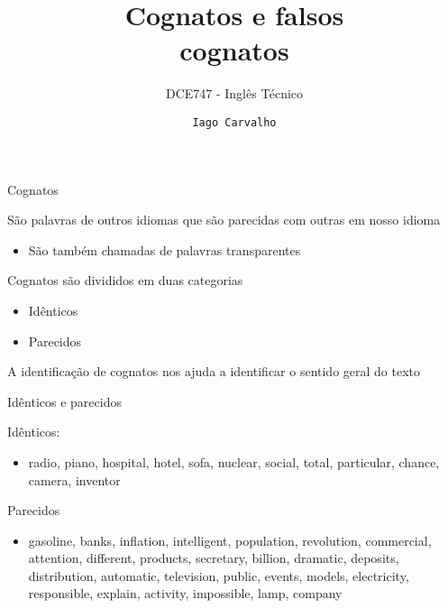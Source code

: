 \documentclass[compress,mathserif]{beamer}
\title{Cognatos e falsos\\ cognatos}
\subtitle{DCE747 - Inglês Técnico}
\author{\texttt{Iago Carvalho}}
\institute{\texttt{Departamento de Ciência da Computação}}
\begin{document}
\begin{frame}
\titlepage

\end{frame}


\begin{frame}{Cognatos}

São palavras de outros idiomas que são parecidas com outras em nosso idioma
\begin{itemize}
    \item São também chamadas de palavras transparentes
\end{itemize}

\vspace{0.5cm}

Cognatos são divididos em duas categorias

\begin{itemize}
    \item Idênticos
    \item Parecidos
\end{itemize}

\vspace{0.5cm}

A identificação de cognatos nos ajuda a identificar o sentido geral do texto

\end{frame}


\begin{frame}{Idênticos e parecidos}

Idênticos:
\begin{itemize}
    \item radio, piano, hospital, hotel, sofa, nuclear, social, total, particular, chance, camera, inventor
\end{itemize}

\vspace{0.5cm}

Parecidos
\begin{itemize}
    \item gasoline, banks, inflation, intelligent, population, revolution, commercial, attention, different, products, secretary, billion, dramatic, deposits, distribution, automatic, television, public, events, models, electricity, responsible, explain, activity, impossible, lamp, company
\end{itemize}

\end{frame}
\end{document}
